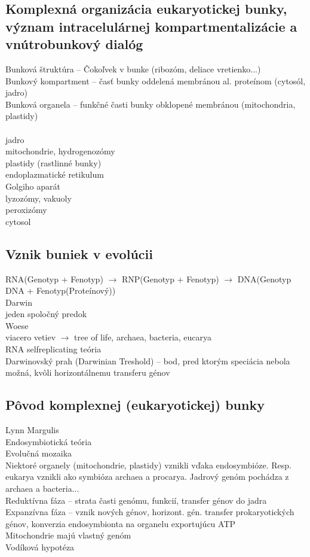 \subsection{Komplexná organizácia eukaryotickej bunky, význam intracelulárnej kompartmentalizácie a vnútrobunkový dialóg}
Bunková štruktúra -- Čokoľvek v bunke (ribozóm, deliace vretienko...)\\
Bunkový kompartment -- časť bunky oddelená membránou al. proteínom (cytosól, jadro)\\
Bunková organela -- funkčné časti bunky obklopené membránou (mitochondria, plastidy)\\
\\
jadro\\
mitochondrie, hydrogenozómy\\
plastidy (rastlinné bunky)\\
endoplazmatické retikulum\\
Golgiho aparát\\
lyzozómy, vakuoly\\
peroxizómy\\
cytosol\\
\subsection{Vznik buniek v evolúcii}
RNA(Genotyp + Fenotyp) $\rightarrow$ RNP(Genotyp + Fenotyp) $\rightarrow$ DNA(Genotyp ~ DNA + Fenotyp(Proteínový))\\
Darwin\\
\tab jeden spoločný predok\\
Woese\\
\tab viacero vetiev $\rightarrow$ tree of life, archaea, bacteria, eucarya\\
\tab RNA selfreplicating teória\\
Darwinovský prah (Darwinian Treshold) -- bod, pred ktorým speciácia nebola možná, kvôli horizontálnemu transferu génov\\
\subsection{Pôvod komplexnej (eukaryotickej) bunky}
Lynn Margulis\\
Endosymbiotická teória\\
Evolučná mozaika\\
Niektoré organely (mitochondrie, plastidy) vznikli vďaka endosymbióze. Resp. eukarya vznikli ako symbióza archaea a procarya. Jadrový genóm pochádza z archaea a bacteria...\\
Reduktívna fáza -- strata časti genómu, funkcií, transfer génov do jadra\\
Expanzívna fáza -- vznik nových génov, horizont. gén. transfer prokaryotických génov, konverzia endosymbionta na organelu exportujúcu ATP\\
Mitochondrie majú vlastný genóm\\
Vodíková hypotéza\\

